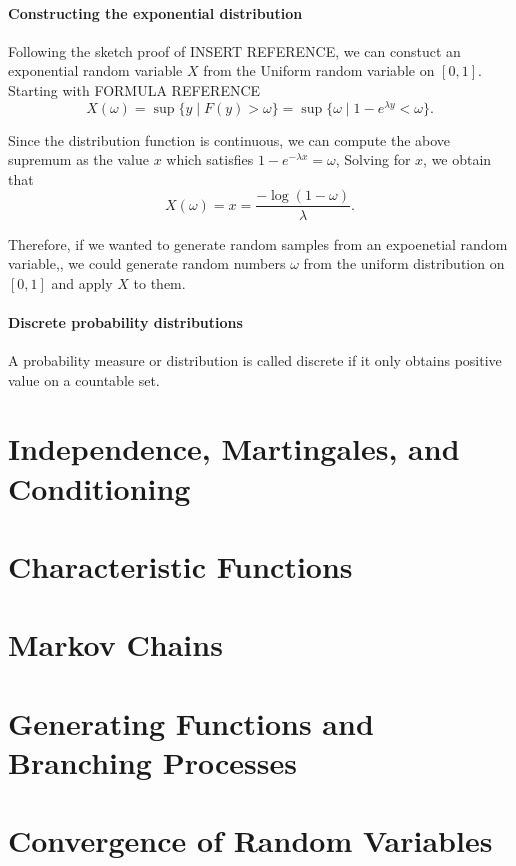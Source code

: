 \documentclass[12pt]{article}
\theoremstyle{definition}
\theoremstyle{remark}
\numberwithin{equation}{section}
\begin{document}
\paragraph{Constructing the exponential distribution}%
\label{par:constructing_the_exponential_distribution}

Following the sketch proof of INSERT REFERENCE, we can constuct an exponential random variable $X$ from the Uniform random variable on $[0,1]$. Starting with FORMULA REFERENCE
\begin{equation}
  X(\omega) = \sup\{y \mid F(y) > \omega \} = \sup\{ \omega \mid 1 - e^{\lambda y} < \omega \}.
\end{equation}

Since the distribution function is continuous, we can compute the above supremum as the value $x$ which satisfies $1 - e^{-\lambda x} = \omega$, Solving for $x$, we obtain that 
\begin{equation}
  X(\omega) = x = \frac{-\log(1-\omega)}{\lambda}.
\end{equation}

Therefore, if we wanted to generate random samples from an expoenetial random variable,, we could generate random numbers $\omega$ from the uniform distribution on $[0,1]$ and apply $X$ to them.


\paragraph{Discrete probability distributions}%
\label{par:discrete_probability_distributions}

A probability measure or distribution is called discrete if it only obtains positive value on a countable set.

\section{Independence, Martingales, and Conditioning}%
  \label{sec:independence_martingales_and_conditioning}
 
  \section{Characteristic Functions}%
  \label{sec:characteristic_functions}
  
  \section{Markov Chains}%
  \label{sec:markov_chains}
  
  \section{Generating Functions and Branching Processes}%
  \label{sec:generating_functions_and_branching_processes}
  
  \section{Convergence of Random Variables}%
  \label{sec:convergence_of_random_variables} 
\end{document}
